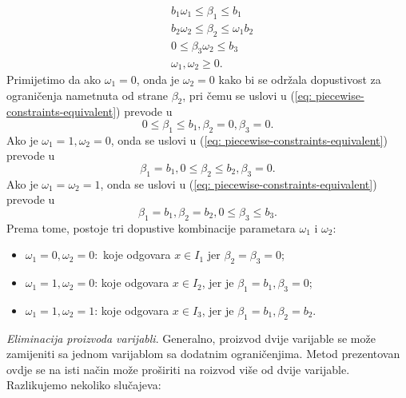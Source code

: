 \documentclass[a4paper, utf8, 11pt, colorlinks]{book}
\begin{document}
\begin{align}
     & b_1 \omega_1 \leq \beta_1 \leq b_1   \nonumber \\
     & b_2 \omega_2 \leq \beta_2 \leq \omega_1 b_2 \nonumber \\
     & 0 \leq \beta_3  \omega_2 \leq b_3\nonumber \\
     & \omega_1, \omega_2 \geq 0. \label{eq: piecewise-constraints-equivalent}
\end{align}
      Primijetimo da ako $\omega_1 = 0$, onda je $\omega_2= 0$ kako bi se održala dopustivost za ograničenja nametnuta  od strane $\beta_2$, pri čemu se uslovi u (\ref{eq: piecewise-constraints-equivalent}) prevode u
      $$ 0 \leq \beta_1 \leq b_1, \beta_2 =0, \beta_3 =0.$$
      Ako je $\omega_1 = 1, \omega_2 = 0$, onda se uslovi u (\ref{eq: piecewise-constraints-equivalent}) prevode u
            $$   \beta_1 = b_1, 0 \leq \beta_2 \leq b_2, \beta_3 =0.$$
    Ako je $\omega_1 = \omega_2 = 1$, onda se  uslovi u (\ref{eq: piecewise-constraints-equivalent}) prevode u
    $$ \beta_1 = b_1, \beta_2 = b_2, 0 \leq \beta_3 \leq b_3.$$
    Prema tome, postoje tri dopustive kombinacije parametara $\omega_1$ i $\omega_2$:
    \begin{itemize}
             \item  $\omega_1 = 0, \omega_2= 0:$ koje odgovara $x \in I_1$ jer $\beta_2=\beta_3=0$;  
             \item $\omega_1 = 1, \omega_2 = 0$: koje odgovara $x\in I_2$, jer je $\beta_1=b_1, \beta_3=0$;
              \item $\omega_1 = 1, \omega_2 = 1$: koje odgovara $x\in I_3$, jer je $\beta_1=b_1, \beta_2=b_2$.
    \end{itemize}
 \emph{Eliminacija proizvoda varijabli}. Generalno, proizvod dvije varijable se može zamijeniti sa jednom varijablom sa dodatnim ograničenjima. Metod prezentovan ovdje se na isti način može proširiti na roizvod više od dvije varijable. Razlikujemo nekoliko slučajeva:
\end{document}
